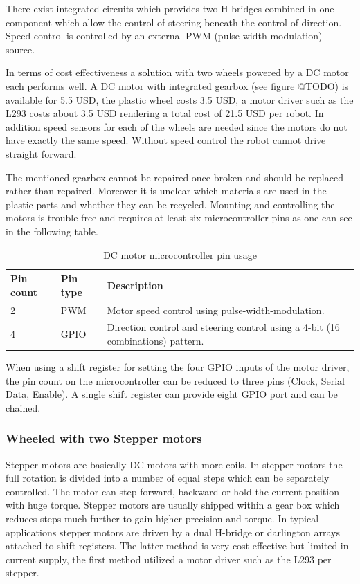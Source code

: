 \documentclass[11pt,a4paper]{article}
\begin{document}
There exist integrated circuits which provides two H-bridges combined in one component which allow the control of steering beneath the control of direction. Speed control is controlled by an external PWM (pulse-width-modulation) source.


In terms of cost effectiveness a solution with two wheels powered by a DC motor each performs well. A DC motor with integrated gearbox (see figure @TODO) is available for 5.5 USD, the plastic wheel costs 3.5 USD, a motor driver such as the L293 costs about 3.5 USD rendering a total cost of 21.5 USD per robot. In addition speed sensors for each of the wheels are needed since the motors do not have exactly the same speed. Without speed control the robot cannot drive straight forward.

The mentioned gearbox cannot be repaired once broken and should be replaced rather than repaired. Moreover it is unclear which materials are used in the plastic parts and whether they can be recycled. Mounting and controlling the motors is trouble free and requires at least six microcontroller pins as one can see in the following table.

\begin{table}[h!]
\centering
\begin{tabular}{p{}p{}p{}}
\toprule
Pin count & Pin type & Description \\
\midrule
2 & PWM  & Motor speed control using pulse-width-modulation.\\
4 & GPIO & Direction control and steering control using a 4-bit (16 combinations) pattern.\\
\bottomrule
\end{tabular}
\caption{DC motor microcontroller pin usage}
\label{tbl:dc_pin}
\end{table}

When using a shift register for setting the four GPIO inputs of the motor driver, the pin count on the microcontroller can be reduced to three pins (Clock, Serial Data, Enable).  A single shift register can provide eight GPIO port and can be chained.


\subsubsection{Wheeled with two Stepper motors}
Stepper motors are basically DC motors with more coils. In stepper motors the full rotation is divided into a number of equal steps which can be separately controlled. The motor can step forward, backward or hold the current position with huge torque. Stepper motors are usually shipped within a gear box which reduces steps much further to gain higher precision and torque. 
In typical applications stepper motors are driven by a dual H-bridge or darlington arrays attached to shift registers. The latter method is very cost effective but limited in current supply, the first method utilized a motor driver such as the L293 per stepper.
\end{document}
